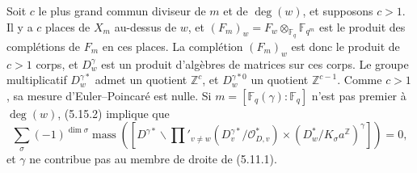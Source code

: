 \documentclass[10pt]{article}
\newcommand{\Fq}{\mathbb F_q}
\newcommand{\Fqm}{\mathbb F_{q^m}}
\newcommand{\Z}{\mathbb Z}
\newcommand{\degm}{\operatorname{deg}}
\newcommand{\mass}{\operatorname{mass}}
\theoremstyle{deligne}
\newcommand{\heading}[1]{\vspace{0.7em}\noindent{\bfseries #1}\quad}
\begin{document}
\heading{5.16.} Soit $c$ le plus grand commun diviseur de $m$ et de $\degm(w)$, et supposons $c>1$. Il y a $c$ places de $X_m$ au-dessus de $w$, et $(F_m)_w=F_w\otimes_{\Fq}\Fqm$ est le produit des complétions de $F_m$ en ces places. La complétion $(F_m)_w$ est donc le produit de $c>1$ corps, et $D_w^\gamma$ est un produit d'algèbres de matrices sur ces corps. Le groupe multiplicatif $D_w^{\gamma *}$ admet un quotient $\Z^c$, et $D_w^{\gamma *0}$ un quotient $\Z^{c-1}$. Comme $c>1$, sa mesure d'Euler--Poincaré est nulle. Si $m=[\Fq(\gamma):\Fq]$ n'est pas premier à $\degm(w)$, (5.15.2) implique que
\[
\sum_\sigma(-1)^{\dim\sigma}\mass\left([D^{\gamma *}\backslash
\prod'_{v\ne w}(D_v^{\gamma *}/\mathcal O_{D,v}^*)\times(D_w^*/K_\sigma a^\Z)^\gamma]\right)=0,
\]
et $\gamma$ ne contribue pas au membre de droite de (5.11.1).
\end{document}
